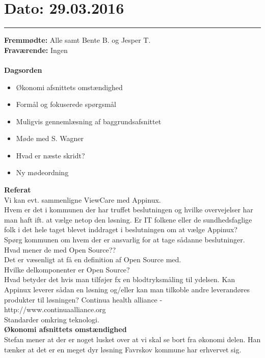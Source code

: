 

\section{Dato: 29.03.2016}
\hrule

\textbf{Fremmødte:} Alle samt Bente B. og Jesper T. \\
\textbf{Fraværende:} Ingen
\\
\\
\textbf{Dagsorden}
\begin{itemize}
	\item Økonomi afsnittets omstændighed
	\item Formål og fokuserede spørgsmål
	\item Muligvis gennemlæsning af baggrundsafsnittet
	\item Møde med S. Wagner
	\item Hvad er næste skridt? 
	\item Ny mødeordning 
\end{itemize}


\textbf{Referat} 
\\
Vi kan evt. sammenligne ViewCare med Appinux. \\
Hvem er det i kommunen der har truffet beslutningen og hvilke overvejelser har man haft ift. at vælge netop den løsning. Er IT folkene eller de sundhedsfaglige folk i det hele taget blevet inddraget i beslutningen om at vælge Appinux? \\
Spørg kommunen om hvem der er ansvarlig for at tage sådanne beslutninger.\\
Hvad mener de med Open Source?? \\
Det er væsenligt at få en definition af Open Source med. \\
Hvilke delkomponenter er Open Source?\\
Hvad betyder det hvis man tilføjer fx en blodtryksmåling til ydelsen. Kan Appinux leverer sådan en løsning og/eller kan man tilkoble andre leverandøres produkter til løsningen?
Continua health alliance - http://www.continuaalliance.org \\
Standarder omkring teknologi.\\


\textbf{Økonomi afsnittets omstændighed} 
\\
Stefan mener at der er noget lusket over at vi skal se bort fra økonomi delen. Han tænker at det er en meget dyr løsning Favrskov kommune har erhvervet sig. 


